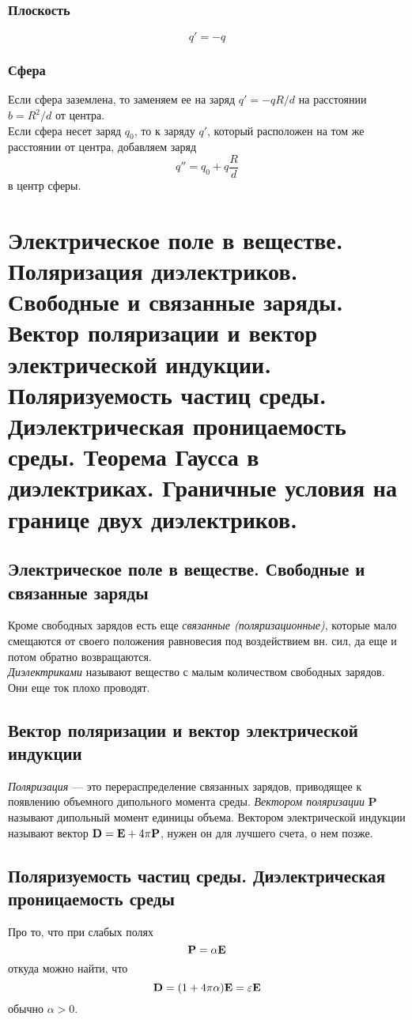 \documentclass[a4paper,12pt]{article} %
\begin{document}
\subsubsection{Плоскость}
$$q' = -q$$
\subsubsection{Сфера}
Если сфера заземлена, то заменяем ее на заряд $q' = -q R / d$ на расстоянии $b = R^2 / d$ от центра.\\
Если сфера несет заряд $q_0$, то к заряду $q'$, который расположен на том же расстоянии от центра, добавляем заряд  $$q'' = q_0 + q \frac{R}{d}$$ в центр сферы.
\section{Электрическое поле в веществе. Поляризация диэлектриков. Свободные и связанные заряды. Вектор поляризации и вектор электрической индукции. Поляризуемость частиц среды. Диэлектрическая проницаемость среды. Теорема Гаусса в диэлектриках. Граничные условия на границе двух диэлектриков.}
\subsection{Электрическое поле в веществе. Свободные и связанные заряды}
Кроме свободных зарядов есть еще {\it связанные (поляризационные)}, которые мало смещаются от своего положения равновесия под воздействием вн. сил, да еще и потом обратно возвращаются.\\
{\it Диэлектриками} называют вещество с малым количеством свободных зарядов. Они еще ток плохо проводят.
\subsection{Вектор поляризации и вектор электрической индукции}
{\it Поляризация} --- это перераспределение связанных зарядов, приводящее к появлению объемного дипольного момента среды. {\it Вектором поляризации} {\bf P} называют дипольный момент единицы объема. Вектором электрической индукции называют вектор ${\bf D = E} + 4 \pi {\bf P}$, нужен он для лучшего счета, о нем позже.
\subsection{Поляризуемость частиц среды. Диэлектрическая проницаемость среды}
Про то, что при слабых полях $${\bf P} = \alpha {\bf E}$$ откуда можно найти, что $${\bf D} = (1 + 4 \pi \alpha) {\bf E} = \varepsilon {\bf E}$$ обычно $\alpha > 0$.
\end{document}
